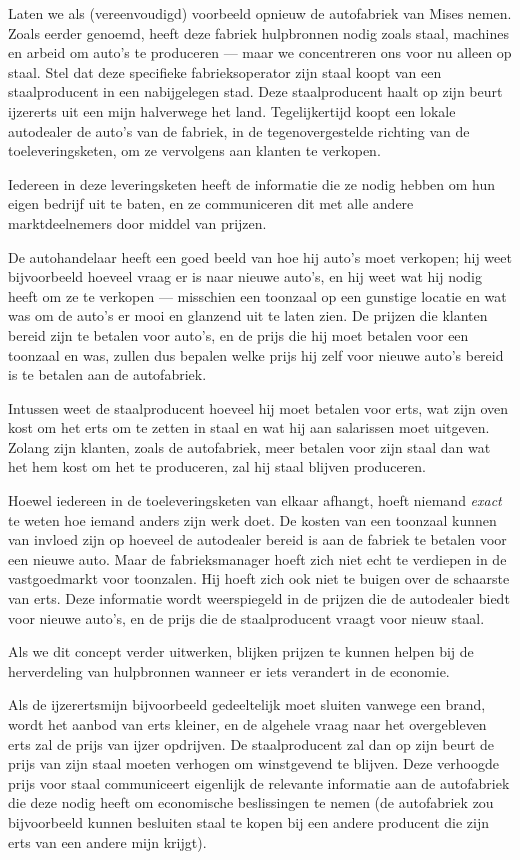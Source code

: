 \documentclass[
  a5paper,
  smalldemyvopaper,11pt,twoside,onecolumn,openright,extrafontsizes,
hidelinks]{memoir}
\begin{document}
Laten we als (vereenvoudigd) voorbeeld opnieuw de autofabriek van Mises
nemen. Zoals eerder genoemd, heeft deze fabriek hulpbronnen nodig zoals
staal, machines en arbeid om auto's te produceren --- maar we
concentreren ons voor nu alleen op staal. Stel dat deze specifieke
fabrieksoperator zijn staal koopt van een staalproducent in een
nabijgelegen stad. Deze staalproducent haalt op zijn beurt ijzererts uit
een mijn halverwege het land. Tegelijkertijd koopt een lokale autodealer
de auto's van de fabriek, in de tegenovergestelde richting van de
toeleveringsketen, om ze vervolgens aan klanten te verkopen.

Iedereen in deze leveringsketen heeft de informatie die ze nodig hebben
om hun eigen bedrijf uit te baten, en ze communiceren dit met alle
andere marktdeelnemers door middel van prijzen.

De autohandelaar heeft een goed beeld van hoe hij auto's moet verkopen;
hij weet bijvoorbeeld hoeveel vraag er is naar nieuwe auto's, en hij
weet wat hij nodig heeft om ze te verkopen --- misschien een toonzaal op
een gunstige locatie en wat was om de auto's er mooi en glanzend uit te
laten zien. De prijzen die klanten bereid zijn te betalen voor auto's,
en de prijs die hij moet betalen voor een toonzaal en was, zullen dus
bepalen welke prijs hij zelf voor nieuwe auto's bereid is te betalen aan
de autofabriek.

Intussen weet de staalproducent hoeveel hij moet betalen voor erts, wat
zijn oven kost om het erts om te zetten in staal en wat hij aan
salarissen moet uitgeven. Zolang zijn klanten, zoals de autofabriek,
meer betalen voor zijn staal dan wat het hem kost om het te produceren,
zal hij staal blijven produceren.

Hoewel iedereen in de toeleveringsketen van elkaar afhangt, hoeft
niemand \emph{exact} te weten hoe iemand anders zijn werk doet. De
kosten van een toonzaal kunnen van invloed zijn op hoeveel de autodealer
bereid is aan de fabriek te betalen voor een nieuwe auto. Maar de
fabrieksmanager hoeft zich niet echt te verdiepen in de vastgoedmarkt
voor toonzalen. Hij hoeft zich ook niet te buigen over de schaarste van
erts. Deze informatie wordt weerspiegeld in de prijzen die de autodealer
biedt voor nieuwe auto's, en de prijs die de staalproducent vraagt voor
nieuw staal.

Als we dit concept verder uitwerken, blijken prijzen te kunnen helpen
bij de herverdeling van hulpbronnen wanneer er iets verandert in de
economie.

Als de ijzerertsmijn bijvoorbeeld gedeeltelijk moet sluiten vanwege een
brand, wordt het aanbod van erts kleiner, en de algehele vraag naar het
overgebleven erts zal de prijs van ijzer opdrijven. De staalproducent
zal dan op zijn beurt de prijs van zijn staal moeten verhogen om
winstgevend te blijven. Deze verhoogde prijs voor staal communiceert
eigenlijk de relevante informatie aan de autofabriek die deze nodig
heeft om economische beslissingen te nemen (de autofabriek zou
bijvoorbeeld kunnen besluiten staal te kopen bij een andere producent
die zijn erts van een andere mijn krijgt).
\end{document}
